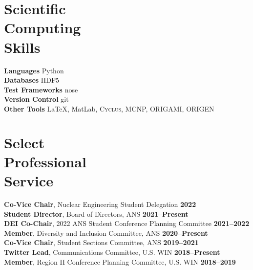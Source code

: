 \documentclass[margin,line]{resume}
\newcommand{\Cyclus}{\textsc{Cyclus}\xspace}%
\begin{document}
\begin{resume}
    \section{\mysidestyle Scientific\\Computing\\Skills}
                \textbf{Languages} \hfill Python\vspace{.5mm}\\%
                \textbf{Databases} \hfill HDF5\vspace{.5mm}\\%
                \textbf{Test Frameworks} \hfill nose\vspace{.5mm}\\%
                \textbf{Version Control} \hfill git\vspace{.5mm}\\%
                \textbf{Other Tools} \hfill \LaTeX, MatLab, \Cyclus, MCNP, ORIGAMI, ORIGEN\vspace{.5mm}%
        \vspace{-3mm}

    \section{\mysidestyle Select\\Professional\\Service}
                \textbf{Co-Vice Chair}, Nuclear Engineering Student Delegation \hfill\textbf{2022}\\
                \textbf{Student Director}, Board of Directors, ANS \hfill \textbf{2021--Present}\vspace{.5mm}\\%
                \textbf{DEI Co-Chair}, 2022 ANS Student Conference Planning Committee \hfill \textbf{2021--2022}\vspace{.5mm}\\%
                \textbf{Member}, Diversity and Inclusion Committee, ANS  \hfill \textbf{2020--Present}\vspace{.5mm}\\%
                \textbf{Co-Vice Chair}, Student Sections Committee, ANS \hfill \textbf{2019--2021}\\
                \textbf{Twitter Lead}, Communications Committee, U.S. WIN  \hfill \textbf{2018--Present}\vspace{.5mm}\\%
                \textbf{Member}, Region II Conference Planning Committee, U.S. WIN  \hfill \textbf{2018--2019}\vspace{.5mm}\\%



\end{resume}
\end{document}
